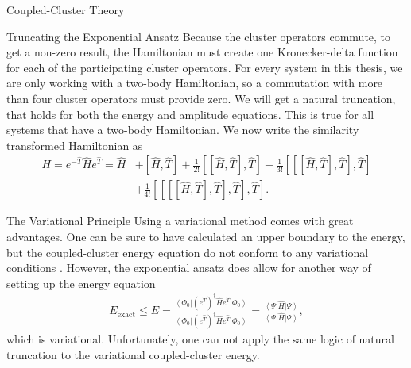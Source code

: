 \documentclass[twoside,english]{uiofysmaster}
\begin{document}
\begin{chapter}{Coupled-Cluster Theory}
\begin{section}{Truncating the Exponential Ansatz}
	  	Because the cluster operators commute, to get a non-zero result, the Hamiltonian must create one Kronecker-delta function for each of the participating cluster operators. For every system in this thesis, we are only working with a two-body Hamiltonian, so a commutation with more than four cluster operators must provide zero. We will get a natural truncation, that holds for both the energy and amplitude equations. This is true for all systems that have a two-body Hamiltonian. We now write the similarity transformed Hamiltonian as
	  	\begin{align}
	  		\overline H = e^{-\hat T} \hat H e^{\hat T} = \hat H &+ [ \hat H, \hat T] + \frac{1}{2!} [[\hat H, \hat T], \hat T] + \frac{1}{3!} [[[ \hat H, \hat T ], \hat T ], \hat T ] \\  &+ \frac{1}{4!} [[[[\hat H, \hat T], \hat T], \hat T], \hat T] \nonumber.
	  	\end{align}

	\end{section}  	

	\begin{section}{The Variational Principle}
		Using a variational method comes with great advantages. One can be sure to have calculated an upper boundary to the energy, but the coupled-cluster energy equation do not conform to any variational conditions \cite{Crawford}. However, the exponential ansatz does allow for another way of setting up the energy equation
		\begin{align}
			E_{\text{exact}} \leq E = \frac{\left< \Phi_0 \right| (e^{\hat T})^\dagger \hat H e^{\hat T} \left| \Phi_0 \right>}{\left< \Phi_0 \right| (e^{\hat T})^\dagger \hat H e^{\hat T} \left| \Phi_0 \right>} = \frac{\left< \Psi \right| \hat H \left| \Psi \right>}{\left< \Psi \right| \hat H \left| \Psi \right>},
		\end{align}
		which is variational. Unfortunately, one can not apply
                the same logic of natural truncation to the
                variational coupled-cluster energy. 
	\end{section}


\end{chapter}
\end{document}
